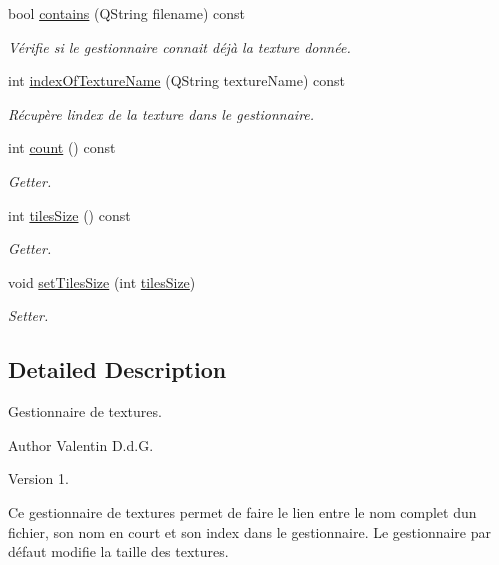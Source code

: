 \begin{DoxyCompactItemize}
bool \hyperlink{class_texture_handler_a28014e2b89614335ec2131cdfb94c0be}{contains} (Q\+String filename) const 
\begin{DoxyCompactList}\small\item\em Vérifie si le gestionnaire connait déjà la texture donnée. \end{DoxyCompactList}\item 
int \hyperlink{class_texture_handler_a4753c03df1e7718542557000c04988b1}{index\+Of\+Texture\+Name} (Q\+String texture\+Name) const 
\begin{DoxyCompactList}\small\item\em Récupère l\textquotesingle{}index de la texture dans le gestionnaire. \end{DoxyCompactList}\item 
int \hyperlink{class_texture_handler_aa3fe3f090ff350d2357b4b6fdb570eb7}{count} () const 
\begin{DoxyCompactList}\small\item\em Getter. \end{DoxyCompactList}\item 
int \hyperlink{class_texture_handler_a57242ce71321d2d3376f621486bd432c}{tiles\+Size} () const 
\begin{DoxyCompactList}\small\item\em Getter. \end{DoxyCompactList}\item 
void \hyperlink{class_texture_handler_aecf95d09a430bbc7b92f0a2189b9ff7d}{set\+Tiles\+Size} (int \hyperlink{class_texture_handler_a57242ce71321d2d3376f621486bd432c}{tiles\+Size})
\begin{DoxyCompactList}\small\item\em Setter. \end{DoxyCompactList}\end{DoxyCompactItemize}


\subsection{Detailed Description}
Gestionnaire de textures. 

\begin{DoxyAuthor}{Author}
Valentin D.\+d.\+G. 
\end{DoxyAuthor}
\begin{DoxyVersion}{Version}
1.
\end{DoxyVersion}
Ce gestionnaire de textures permet de faire le lien entre le nom complet d\textquotesingle{}un fichier, son nom en court et son index dans le gestionnaire. Le gestionnaire par défaut modifie la taille des textures. 

